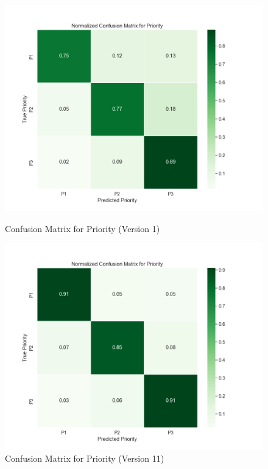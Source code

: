 \begin{figure}[h!]
    \centering
    \begin{minipage}{0.49\textwidth}
        \centering
        \includegraphics[width=\textwidth]{ch4/assets/v1_confusion_priority.png}
        \caption{Confusion Matrix for Priority (Version 1)}
        \label{fig:confusion_priority_v1}
    \end{minipage}
    \hfill
    \begin{minipage}{0.49\textwidth}
        \centering
        \includegraphics[width=\textwidth]{ch4/assets/v11_confusion_priority.png}
        \caption{Confusion Matrix for Priority (Version 11)}
        \label{fig:confusion_priority_v11}
    \end{minipage}
\end{figure}

